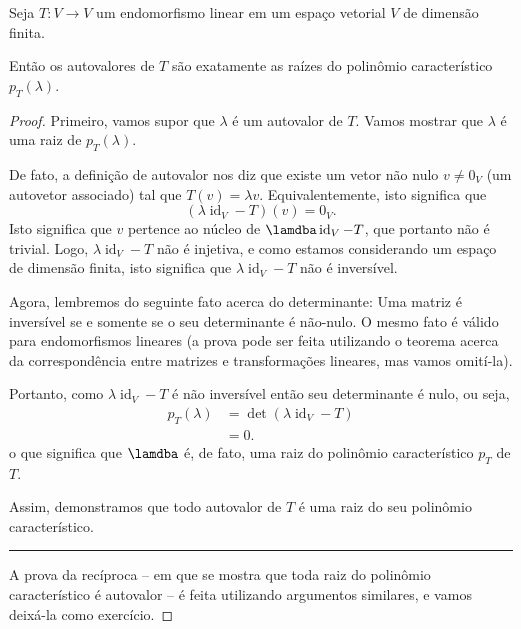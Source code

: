 \begin{theorem}
	Seja $T\colon V\to V$ um endomorfismo linear em um espaço vetorial $V$ de dimensão finita.
	
	Então os autovalores de $T$ são exatamente as raízes do polinômio característico $p_T(\lambda)$.
\end{theorem}

\begin{proof}
	Primeiro, vamos supor que $\lambda$ é um autovalor de $T$. Vamos mostrar que $\lambda$ é uma raiz de $p_T(\lambda)$.
	
	De fato, a definição de autovalor nos diz que existe um vetor não nulo $v\neq 0_V$ (um autovetor associado) tal que $T(v)=\lambda v$. Equivalentemente, isto significa que
	\[(\lambda\operatorname{id}_V-T)(v)=0_V.\]
	Isto significa que $v$ pertence ao núcleo de $\lamdba\operatorname{id}_V-T$, que portanto não é trivial. Logo, $\lambda\operatorname{id}_V-T$ não é injetiva, e como estamos considerando um espaço de dimensão finita, isto significa que $\lambda\operatorname{id}_V-T$ não é inversível.
	
	Agora, lembremos do seguinte fato acerca do determinante: Uma matriz é inversível se e somente se o seu determinante é não-nulo. O mesmo fato é válido para endomorfismos lineares (a prova pode ser feita utilizando o teorema acerca da correspondência entre matrizes e transformações lineares, mas vamos omití-la).
	
	Portanto, como $\lambda\operatorname{id}_V-T$ é não inversível então seu determinante é nulo, ou seja,
	\begin{align*}
	p_T(\lambda)
		&=\det\left(\lambda\operatorname{id}_V-T\right)\\
		&=0.
	\end{align*}
	o que significa que $\lamdba$ é, de fato, uma raiz do polinômio característico $p_T$ de $T$.
	
	Assim, demonstramos que todo autovalor de $T$ é uma raiz do seu polinômio característico.
	
	\hrule
	
	A prova da recíproca -- em que se mostra que toda raiz do polinômio característico é autovalor -- é feita utilizando argumentos similares, e vamos deixá-la como exercício.
\end{proof}